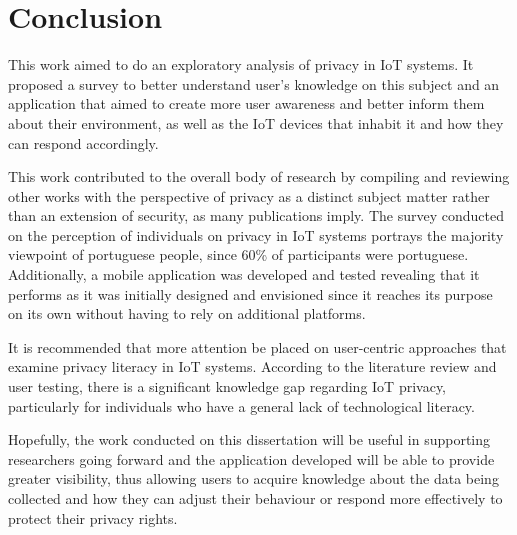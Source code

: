 %
%
\section{Conclusion}\label{section:conclusion}

This work aimed to do an exploratory analysis of privacy in IoT systems.
It proposed a survey to better understand user's knowledge on this subject
and an application that aimed to create more user awareness and better inform
them about their environment, as well as the IoT devices that inhabit it and
how they can respond accordingly.

This work contributed to the overall body of research by compiling and reviewing
other works with the perspective of privacy as a distinct subject matter rather than
an extension of security, as many publications imply. The survey conducted
on the perception of individuals on privacy in IoT systems portrays the majority
viewpoint of portuguese people, since 60\% of participants were portuguese. Additionally,
a mobile application was developed and tested revealing that it performs as it was
initially designed and envisioned since it reaches its purpose on its own without having
to rely on additional platforms.

It is recommended that more attention be placed on user-centric approaches that
examine privacy literacy in IoT systems. According to the literature review and
user testing, there is a significant knowledge gap regarding IoT privacy, particularly
for individuals who have a general lack of technological literacy.

Hopefully, the work conducted on this dissertation will be useful in
supporting researchers going forward and the application developed will be able to
provide greater visibility, thus allowing users to acquire knowledge about
the data being collected and how they can adjust their behaviour or respond
more effectively to protect their privacy rights.
